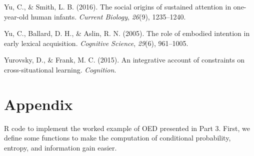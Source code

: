 \documentclass[english,floatsintext,man]{apa6}
\theoremstyle{definition}
\theoremstyle{definition}
\theoremstyle{definition}
\theoremstyle{remark}
\begin{document}
\hypertarget{ref-yu2016social}{}
Yu, C., \& Smith, L. B. (2016). The social origins of sustained
attention in one-year-old human infants. \emph{Current Biology},
\emph{26}(9), 1235--1240.

\hypertarget{ref-yu2005role}{}
Yu, C., Ballard, D. H., \& Aslin, R. N. (2005). The role of embodied
intention in early lexical acquisition. \emph{Cognitive Science},
\emph{29}(6), 961--1005.

\hypertarget{ref-yurovsky2014algorithmic}{}
Yurovsky, D., \& Frank, M. C. (2015). An integrative account of
constraints on cross-situational learning. \emph{Cognition}.

\newpage

\hypertarget{app}{\section{Appendix}\label{app}}

\setlength{\parindent}{0in} \setlength{\leftskip}{0in}

R code to implement the worked example of OED presented in Part 3.
First, we define some functions to make the computation of conditional
probability, entropy, and information gain easier.
\end{document}
